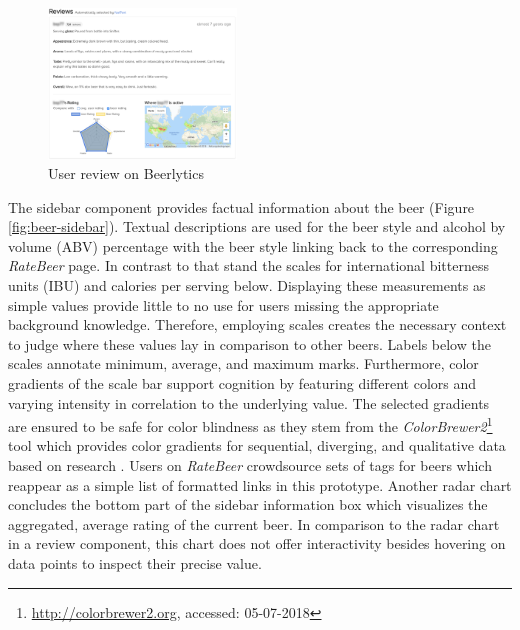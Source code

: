 \begin{figure}[b]
\includegraphics[width=5cm]{assets/beer_review.png}
\caption{User review on Beerlytics}
\centering
\label{fig:beer-review}
\end{figure}

The sidebar component provides factual information about the beer (Figure \ref{fig:beer-sidebar}).
Textual descriptions are used for the beer style and alcohol by volume (ABV) percentage with the beer style linking back to the corresponding \textit{RateBeer} page.
In contrast to that stand the scales for international bitterness units (IBU) and calories per serving below.
Displaying these measurements as simple values provide little to no use for users missing the appropriate background knowledge.
Therefore, employing scales creates the necessary context to judge where these values lay in comparison to other beers.
Labels below the scales annotate minimum, average, and maximum marks.
Furthermore, color gradients of the scale bar support cognition by featuring different colors and varying intensity in correlation to the underlying value.
The selected gradients are ensured to be safe for color blindness as they stem from the \textit{ColorBrewer2}\footnote{\url{http://colorbrewer2.org}, accessed: 05-07-2018} tool which provides color gradients for sequential, diverging, and qualitative data based on research \cite{Harrower2011}.
Users on \textit{RateBeer} crowdsource sets of tags for beers which reappear as a simple list of formatted links in this prototype.
Another radar chart concludes the bottom part of the sidebar information box which visualizes the aggregated, average rating of the current beer.
In comparison to the radar chart in a review component, this chart does not offer interactivity besides hovering on data points to inspect their precise value.

